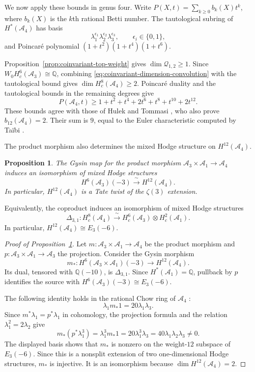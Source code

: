 \documentclass[12 pt]{amsart}
\newcommand{\QQ}{\mathbb{Q}}
\newcommand{\cA}{\mathcal{A}}
\newcommand{\cQ}{\mathcal{Q}}
\newcommand{\<}{\langle}
\renewcommand{\>}{\rangle}
\newtheorem{proposition}[theorem]{Proposition}
\theoremstyle{definition}
\begin{document}
We now apply these bounds in genus four. Write $P(X, t) = \sum_{k \geq 0} b_k(X) t^k$, where $b_k(X)$ is the $k$th rational Betti number. The tautological subring of $H^*(\cA_4)$ has basis
\[
\lambda_1^{\epsilon_1} \lambda_2^{\epsilon_2} \lambda_3^{\epsilon_3}, \qquad \epsilon_i \in \{0, 1\},
\]
and Poincar\'e polynomial $(1 + t^2)(1 + t^4)(1 + t^6)$.

Proposition~\ref{prop:coinvariant-top-weight} gives $\dim \cQ_{1, 2} \geq 1$. Since $W_0 H_c^6(\cA_3) \cong \QQ$, combining \eqref{eq:coinvariant-dimension-convolution} with the tautological bound gives $\dim H_c^8(\cA_4) \geq 2$. Poincar\'e duality and the tautological bounds in the remaining degrees give
\begin{equation}\label{eq:genus-four-betti-bound}
P(\cA_4, t) \geq 1 + t^2 + t^4 + 2t^6 + t^8 + t^{10} + 2t^{12}.
\end{equation}
These bounds agree with those of Hulek and Tommasi \cite[Corollary~3]{HulekTommasiA4}, who also prove $b_{12}(\cA_4) = 2$. Their sum is $9$, equal to the Euler characteristic computed by Ta\"ibi \cite[Proposition~3]{HulekTommasiTopology}.

The product morphism also determines the mixed Hodge structure on $H^{12}(\cA_4)$.

\begin{proposition}\label{prop:genus-four-extension}
The Gysin map for the product morphism $\cA_3 \times \cA_1 \to \cA_4$ induces an isomorphism of mixed Hodge structures
\[
H^6(\cA_3)(-3) \xrightarrow{\ \sim \ } H^{12}(\cA_4).
\]
In particular, $H^{12}(\cA_4)$ is a Tate twist of the $\zeta(3)$ extension.
\end{proposition}

\noindent Equivalently, the coproduct induces an isomorphism of mixed Hodge structures
\[
\Delta_{3, 1} \colon H_c^8(\cA_4) \xrightarrow{\ \sim \ } H_c^6(\cA_3) \otimes H_c^2(\cA_1).
\]
In particular, $H^{12}(\cA_4) \cong E_3(-6)$.

\begin{proof}[Proof of Proposition~\ref{prop:genus-four-extension}]
Let $m \colon \cA_3 \times \cA_1 \to \cA_4$ be the product morphism and $p \colon \cA_3 \times \cA_1 \to \cA_3$ the projection. Consider the Gysin morphism
\[
m_* \colon H^6(\cA_3 \times \cA_1)(-3) \longrightarrow H^{12}(\cA_4).
\]
Its dual, tensored with $\QQ(-10)$, is $\Delta_{3, 1}$. Since $H^*(\cA_1) = \QQ$, pullback by $p$ identifies the source with $H^6(\cA_3)(-3) \cong E_3(-6)$.

The following identity holds in the rational Chow ring of $\cA_4$ \cite[proof of Proposition~37]{COP}:
\[
\lambda_1 m_* 1 = 20 \lambda_1 \lambda_3.
\]
Since $m^* \lambda_1 = p^* \lambda_1$ in cohomology, the projection formula and the relation $\lambda_1^2 = 2 \lambda_2$ give
\[
m_*(p^* \lambda_1^3) = \lambda_1^3 m_* 1 = 20 \lambda_1^3 \lambda_3 = 40 \lambda_1 \lambda_2 \lambda_3 \neq 0.
\]
The displayed basis shows that $m_*$ is nonzero on the weight-$12$ subspace of $E_3(-6)$. Since this is a nonsplit extension of two one-dimensional Hodge structures, $m_*$ is injective. It is an isomorphism because $\dim H^{12}(\cA_4) = 2$.
\end{proof}
\end{document}
